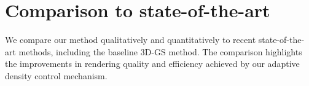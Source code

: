 \documentclass[12pt]{report}
\begin{document}
\pgfplotsset{compat=1.17}





\section{Comparison to state-of-the-art}
We compare our method qualitatively and quantitatively to recent state-of-the-art methods, including the baseline 3D-GS method. The comparison highlights the improvements in rendering quality and efficiency achieved by our adaptive density control mechanism.

\end{document}

